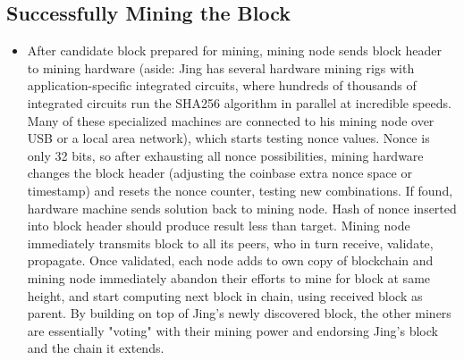 \documentclass[english, 11pt]{article}
\begin{document}
\subsection{Successfully Mining the Block}
\begin{itemize}
    \item After candidate block prepared for mining, mining node sends block header to mining hardware (aside: Jing has several hardware mining rigs with application-specific integrated circuits, where hundreds of thousands of integrated circuits run the SHA256 algorithm in parallel at incredible speeds. Many of these specialized machines are connected to his mining node over USB or a local area network), which starts testing nonce values. Nonce is only 32 bits, so after exhausting all nonce possibilities, mining hardware changes the block header (adjusting the coinbase extra nonce space or timestamp) and resets the nonce counter, testing new combinations. If found, hardware machine sends solution back to mining node. Hash of nonce inserted into block header should produce result less than target. Mining node immediately transmits block to all its peers, who in turn receive, validate, propagate. Once validated, each node adds to own copy of blockchain and mining node immediately abandon their efforts to mine for block at same height, and start computing next block in chain, using received block as parent. By building on top of Jing’s newly discovered block, the other miners are essentially "voting" with their mining power and endorsing Jing’s block and the chain it extends.
\end{itemize}
\end{document}

